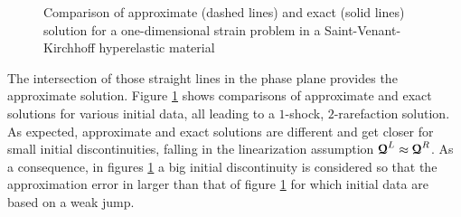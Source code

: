 \begin{figure}[h!]
  \centering
  {  \label{subfig:SVK_Approx1}}
  {  \label{subfig:SVK_Approx4}}
  \caption{Comparison of approximate (dashed lines) and exact (solid lines) solution for a one-dimensional strain problem in a Saint-Venant-Kirchhoff hyperelastic material}
  \label{fig:comparison_exact_approx}
\end{figure}
The intersection of those straight lines in the phase plane provides the approximate solution. Figure \ref{fig:comparison_exact_approx} shows comparisons of approximate and exact solutions for various initial data, all leading to a $1$-shock, $2$-rarefaction solution. As expected, approximate and exact solutions are different and get closer for small initial discontinuities, falling in the linearization assumption ${\boldsymbol{\mathcal{Q}}}^L\approx {\boldsymbol{\mathcal{Q}}}^R$. As a consequence, in figures \ref{fig:comparison_exact_approx} a big initial discontinuity is considered so that the approximation error in larger than that of figure \ref{fig:comparison_exact_approx} for which initial data are based on a weak jump.


